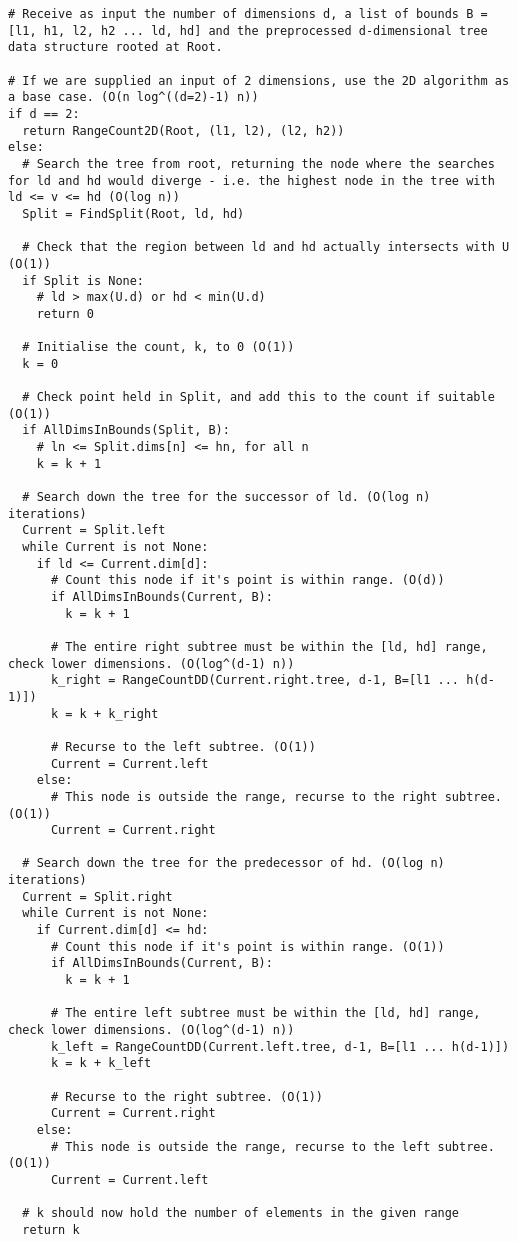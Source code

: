 \documentclass[paper=a4, fontsize=12pt]{article}
\begin{document}
\begin{lstlisting}
# Receive as input the number of dimensions d, a list of bounds B = [l1, h1, l2, h2 ... ld, hd] and the preprocessed d-dimensional tree data structure rooted at Root.

# If we are supplied an input of 2 dimensions, use the 2D algorithm as a base case. (O(n log^((d=2)-1) n))
if d == 2:
  return RangeCount2D(Root, (l1, l2), (l2, h2))
else:
  # Search the tree from root, returning the node where the searches for ld and hd would diverge - i.e. the highest node in the tree with ld <= v <= hd (O(log n))
  Split = FindSplit(Root, ld, hd)

  # Check that the region between ld and hd actually intersects with U (O(1))
  if Split is None:
    # ld > max(U.d) or hd < min(U.d)
    return 0

  # Initialise the count, k, to 0 (O(1))
  k = 0

  # Check point held in Split, and add this to the count if suitable (O(1))
  if AllDimsInBounds(Split, B):
    # ln <= Split.dims[n] <= hn, for all n
    k = k + 1

  # Search down the tree for the successor of ld. (O(log n) iterations)
  Current = Split.left
  while Current is not None:
    if ld <= Current.dim[d]:
      # Count this node if it's point is within range. (O(d))
      if AllDimsInBounds(Current, B):
        k = k + 1

      # The entire right subtree must be within the [ld, hd] range, check lower dimensions. (O(log^(d-1) n))
      k_right = RangeCountDD(Current.right.tree, d-1, B=[l1 ... h(d-1)])
      k = k + k_right

      # Recurse to the left subtree. (O(1))
      Current = Current.left
    else:
      # This node is outside the range, recurse to the right subtree. (O(1))
      Current = Current.right

  # Search down the tree for the predecessor of hd. (O(log n) iterations)
  Current = Split.right
  while Current is not None:
    if Current.dim[d] <= hd:
      # Count this node if it's point is within range. (O(1))
      if AllDimsInBounds(Current, B):
        k = k + 1

      # The entire left subtree must be within the [ld, hd] range, check lower dimensions. (O(log^(d-1) n))
      k_left = RangeCountDD(Current.left.tree, d-1, B=[l1 ... h(d-1)])
      k = k + k_left

      # Recurse to the right subtree. (O(1))
      Current = Current.right
    else:
      # This node is outside the range, recurse to the left subtree. (O(1))
      Current = Current.left

  # k should now hold the number of elements in the given range
  return k
\end{lstlisting}
\end{document}
